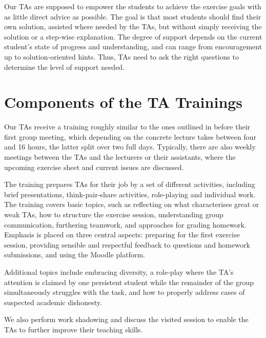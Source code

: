\documentclass[sigconf,screen]{acmart}
\begin{document}
Our TAs are supposed to empower the students to achieve the exercise goals with as little
direct advice as possible. The goal is that most students should find their own solution,
assisted where needed by the TAs, but without simply receiving the solution or a 
step-wise explanation. The degree of support depends on the current student's
state of progress and understanding, and can range from encouragement
up to solution-oriented hints. Thus, TAs need to ask the right questions to determine the level
of support needed.

\section{Components of the TA Trainings}

Our TAs receive a training roughly similar to the ones outlined in
\cite{Forbes:2017:SIC:3017680.3017694}
before their first group meeting,
which depending on the concrete lecture takes between four and 16 hours, the latter split over two full days.
Typically, there are also weekly meetings between the TAs and the lecturers or their assistants, where 
the upcoming exercise sheet and current issues are discussed.

The training prepares TAs for their job by a set of different activities, including 
brief presentations, think-pair-share activities, role-playing and individual work. The training covers
basic topics, such as reflecting on what characterises great or weak TAs, how to structure the exercise
session, understanding group communication, furthering teamwork, and approaches for grading homework.
Emphasis is placed on three central aspects: preparing for the first exercise session, providing sensible
and respectful feedback to questions and homework submissions, and using the Moodle platform.

Additional topics include embracing diversity, a role-play where the TA's attention is claimed by one
persistent student while the remainder of the group simultaneously struggles with the task, 
and how to properly address cases of suspected academic dishonesty.

We also perform work shadowing and discuss the visited session to enable the TAs to further improve 
their teaching skills.


\end{document}
